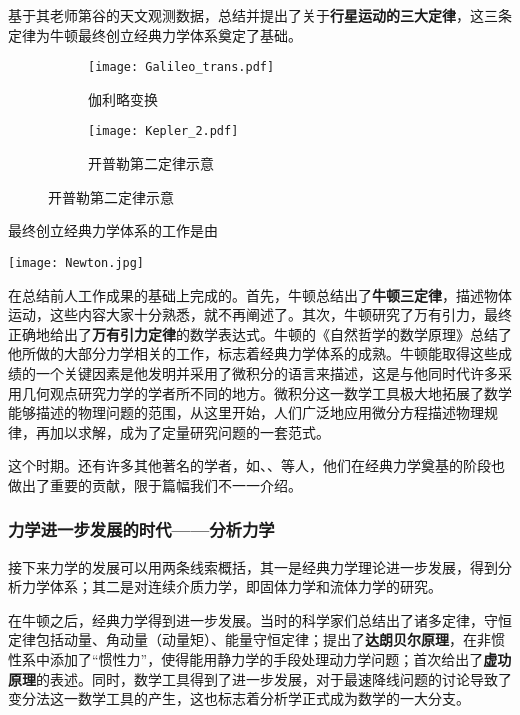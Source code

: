 基于其老师第谷的天文观测数据，总结并提出了关于\textbf{行星运动的三大定律}，这三条定律为牛顿最终创立经典力学体系奠定了基础。

\begin{figure}[ht]
    \centering
    \begin{subfigure}[t]{0.4\textwidth} \centering
        \texttt{[image: Galileo\_trans.pdf]}
        \caption{伽利略变换}
    \end{subfigure}\quad
    \begin{subfigure}[t]{0.4\textwidth} \centering
        \texttt{[image: Kepler\_2.pdf]}
        \caption{开普勒第二定律示意}
    \end{subfigure}
\end{figure}

最终创立经典力学体系的工作是由
\begin{marginparfigure}
    \centering
    \texttt{[image: Newton.jpg]}
\end{marginparfigure}在总结前人工作成果的基础上完成的。首先，牛顿总结出了\textbf{牛顿三定律}，描述物体运动，这些内容大家十分熟悉，就不再阐述了。其次，牛顿研究了万有引力，最终正确地给出了\textbf{万有引力定律}的数学表达式。牛顿的《自然哲学的数学原理》总结了他所做的大部分力学相关的工作，标志着经典力学体系的成熟。牛顿能取得这些成绩的一个关键因素是他发明并采用了微积分的语言来描述，这是与他同时代许多采用几何观点研究力学的学者所不同的地方。微积分这一数学工具极大地拓展了数学能够描述的物理问题的范围，从这里开始，人们广泛地应用微分方程描述物理规律，再加以求解，成为了定量研究问题的一套范式。

这个时期。还有许多其他著名的学者，如、、等人，他们在经典力学奠基的阶段也做出了重要的贡献，限于篇幅我们不一一介绍。

\subsubsection{力学进一步发展的时代——分析力学}

接下来力学的发展可以用两条线索概括，其一是经典力学理论进一步发展，得到分析力学体系；其二是对连续介质力学，即固体力学和流体力学的研究。

在牛顿之后，经典力学得到进一步发展。当时的科学家们总结出了诸多定律，守恒定律包括动量、角动量（动量矩）、能量守恒定律；提出了\textbf{达朗贝尔原理}，在非惯性系中添加了“惯性力”，使得能用静力学的手段处理动力学问题；首次给出了\textbf{虚功原理}的表述。同时，数学工具得到了进一步发展，对于最速降线问题的讨论导致了变分法这一数学工具的产生，这也标志着分析学正式成为数学的一大分支。


